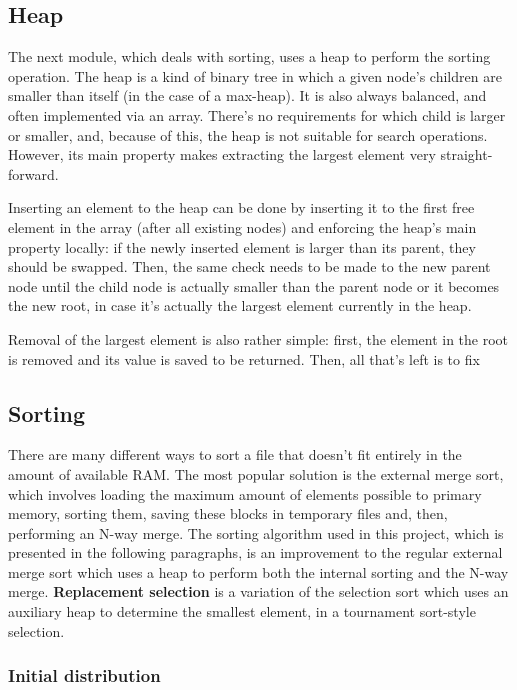 \documentclass[10pt,a4paper]{article}
\begin{document}
\subsection*{Heap}

The next module, which deals with sorting, uses a heap to perform the sorting operation. The heap is a kind of binary tree in which a given node's children are smaller than itself (in the case of a max-heap). It is also always balanced, and often implemented via an array. There's no requirements for which child is larger or smaller, and, because of this, the heap is not suitable for search operations. However, its main property makes extracting the largest element very straight-forward.

Inserting an element to the heap can be done by inserting it to the first free element in the array (after all existing nodes) and enforcing the heap's main property locally: if the newly inserted element is larger than its parent, they should be swapped. Then, the same check needs to be made to the new parent node until the child node is actually smaller than the parent node or it becomes the new root, in case it's actually the largest element currently in the heap.

Removal of the largest element is also rather simple: first, the element in the root is removed and its value is saved to be returned. Then, all that's left is to fix 

\subsection*{Sorting}

There are many different ways to sort a file that doesn't fit entirely in the amount of available RAM. The most popular solution is the external merge sort, which involves loading the maximum amount of elements possible to primary memory, sorting them, saving these blocks in temporary files and, then, performing an N-way merge. The sorting algorithm used in this project, which is presented in the following paragraphs, is an improvement to the regular external merge sort which uses a heap to perform both the internal sorting and the N-way merge. \textbf{Replacement selection} is a variation of the selection sort which uses an auxiliary heap to determine the smallest element, in a tournament sort-style selection.

\subsubsection*{Initial distribution}
\end{document}
